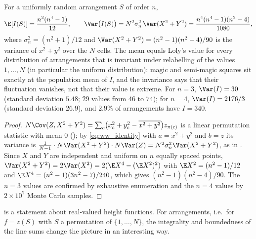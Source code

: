 \begin{corollary}
\label{cor:loly_null}
For a uniformly random arrangement $S$ of order $n$,
\begin{equation}
\E[I(S)]=\frac{n^{2}(n^{4}-1)}{12},\qquad
\Var\bigl(I(S)\bigr)=N^{2}\sigma_n^{2}\,\Var(X^{2}+Y^{2})=\frac{n^{4}(n^{4}-1)(n^{2}-4)}{1080},
\label{eq:loly_null}
\end{equation}
where $\sigma_n^{2}=(n^{2}+1)/12$ and $\Var(X^{2}+Y^{2})=(n^{2}-1)(n^{2}-4)/90$ is the variance of $x^{2}+y^{2}$ over the $N$ cells.
The mean equals Loly's value for every distribution of arrangements that is invariant under relabelling of the values
$1,\dots,N$ (in particular the uniform distribution):
magic and semi-magic squares sit exactly at the population mean of $I$, and the invariance says that their fluctuation
vanishes, not that their value is extreme.  For $n=3$, $\Var(I)=30$ (standard deviation $5.48$; $29$ values from $46$ to $74$);
for $n=4$, $\Var(I)=2176/3$ (standard deviation $26.9$), and $2.9\%$ of arrangements have $I=340$.
\end{corollary}

\begin{proof}
$N\Cov(Z,X^{2}+Y^{2})=\sum_c\bigl(x_c^{2}+y_c^{2}-\overline{x^{2}+y^{2}}\bigr)z_{\pi(c)}$ is a linear permutation statistic
with mean $0$ (); by \eqref{eq:ww_identity} with $a=x^{2}+y^{2}$ and $b=z$ its variance is
$\frac1{N-1}\cdot N\Var(X^{2}+Y^{2})\cdot N\Var(Z)=N^{2}\sigma_n^{2}\Var(X^{2}+Y^{2})$, as in .
Since $X$ and $Y$ are independent and uniform on $n$ equally spaced points, $\Var(X^{2}+Y^{2})=2\Var(X^{2})=2(\E X^{4}-(\E X^{2})^{2})$
with $\E X^{2}=(n^{2}-1)/12$ and $\E X^{4}=(n^{2}-1)(3n^{2}-7)/240$, which gives $(n^{2}-1)(n^{2}-4)/90$.
The $n=3$ values are confirmed by exhaustive enumeration and the $n=4$ values by $2\times10^{7}$ Monte Carlo samples.
\end{proof}

 is a statement about real-valued height functions.  For arrangements, i.e.\ for
$f=z(S)$ with $S$ a permutation of $\{1,\dots,N\}$, the integrality and boundedness of the line sums
change the picture in an interesting way.

